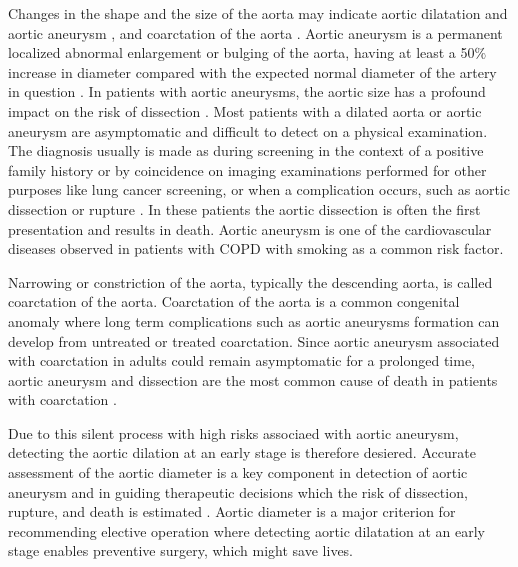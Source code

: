 Changes in the shape and the size of the aorta may indicate aortic dilatation and aortic aneurysm \autocite{american20102010,wolak2008aortic}, and coarctation of the aorta \autocite{von2002predictors}. Aortic aneurysm is a permanent localized abnormal enlargement or bulging of the aorta, having at least a 50$\%$ increase in diameter compared with the expected normal diameter of the artery in question \autocite{american20102010}. In patients with aortic aneurysms, the aortic size has a profound impact on the risk of dissection \cite{davies2006novel, kim2015risk}.  Most patients with a dilated aorta or aortic aneurysm are asymptomatic and difficult to detect on a physical examination. The diagnosis usually is made as during screening in the context of a positive family history or by coincidence on imaging examinations performed for other purposes like lung cancer screening, or when a complication occurs, such as aortic dissection or rupture \autocite{melvinsdottir2016incidence}. In these patients the aortic dissection is often the first presentation and results in death. Aortic aneurysm is one of the cardiovascular diseases observed in patients with \gls{COPD} with smoking as a common risk factor.

Narrowing or constriction of the aorta, typically the descending aorta, is called coarctation of the aorta. Coarctation of the aorta is a common congenital anomaly where long term complications such as aortic aneurysms formation can develop from untreated or treated coarctation\autocite{frandsen2018ascending,von2002predictors}. Since aortic aneurysm associated with coarctation in adults could remain asymptomatic for a prolonged time, aortic aneurysm and dissection are the most common cause of death in patients with coarctation \autocite{teimouri2013congenital}.

Due to this silent process with high risks associaed with aortic aneurysm, detecting the aortic dilation at an early stage is therefore desiered. Accurate assessment of the aortic diameter is a key component in detection of aortic aneurysm and in guiding therapeutic decisions which the risk of dissection, rupture, and death is estimated \autocite{wolak2008aortic}. Aortic diameter is a major criterion for recommending elective operation where detecting aortic dilatation at an early stage enables preventive surgery, which might save lives.


